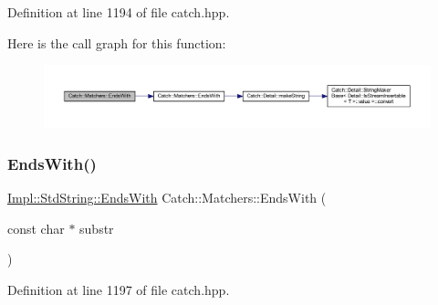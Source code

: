 Definition at line 1194 of file catch.\+hpp.

Here is the call graph for this function\+:\nopagebreak
\begin{figure}[H]
\begin{center}
\leavevmode
\includegraphics[width=350pt]{namespace_catch_1_1_matchers_a1e32a2d23a1eb9eda9840c712c7b00c1_cgraph}
\end{center}
\end{figure}
\hypertarget{namespace_catch_1_1_matchers_ae3e6d8f7fea6fac6513596b23e5d5153}{}\label{namespace_catch_1_1_matchers_ae3e6d8f7fea6fac6513596b23e5d5153} 
\subsubsection{\texorpdfstring{Ends\+With()}{EndsWith()}\hspace{0.1cm}{\footnotesize\ttfamily [2/2]}}
{\footnotesize\ttfamily \hyperlink{struct_catch_1_1_matchers_1_1_impl_1_1_std_string_1_1_ends_with}{Impl\+::\+Std\+String\+::\+Ends\+With} Catch\+::\+Matchers\+::\+Ends\+With (\begin{DoxyParamCaption}\item[{const char $\ast$}]{substr }\end{DoxyParamCaption})\hspace{0.3cm}{\ttfamily [inline]}}



Definition at line 1197 of file catch.\+hpp.

